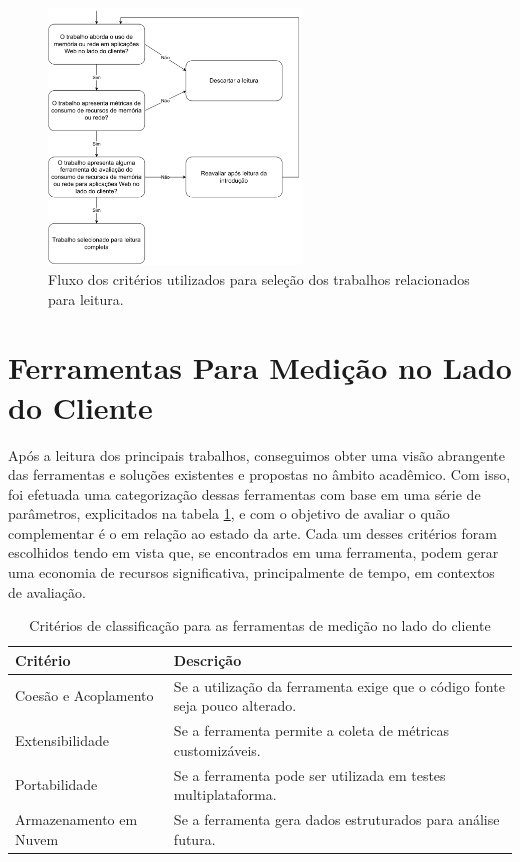 \documentclass[12pt]{tcc}
\begin{document}
	\begin{figure}[H]
		\centering
		\includegraphics[width=0.6\textwidth]{figures/fluxo-decisao-leitura.pdf}
		\caption{Fluxo dos critérios utilizados para seleção dos trabalhos relacionados para leitura.}
		\label{fig:fluxo-leitura}
	\end{figure}

	\section{Ferramentas Para Medição no Lado do Cliente}
	\label{sec:ferramentas-medicao-clientside}

	Após a leitura dos principais trabalhos, conseguimos obter uma visão abrangente das ferramentas e soluções existentes e propostas no âmbito acadêmico. Com isso, foi efetuada uma categorização dessas ferramentas com base em uma série de parâmetros, explicitados na tabela \ref{tab:criterio-avaliacao-ferramentas}, e com o objetivo de avaliar o quão complementar é o  em relação ao estado da arte. Cada um desses critérios foram escolhidos tendo em vista que, se encontrados em uma ferramenta, podem gerar uma economia de recursos significativa, principalmente de tempo, em contextos de avaliação.

	\begin{table}[H]
		\centering
		\caption{Critérios de classificação para as ferramentas de medição no lado do cliente}
		\begin{tabular}{lp{8.5cm}}
			\toprule
			\textbf{Critério} & \textbf{Descrição}\\
			\midrule 
			Coesão e Acoplamento & Se a utilização da ferramenta exige que o código fonte seja pouco alterado.\\
			Extensibilidade & Se a ferramenta permite a coleta de métricas customizáveis.\\
			Portabilidade & Se a ferramenta pode ser utilizada em testes multiplataforma.\\
			Armazenamento em Nuvem & Se a ferramenta gera dados estruturados para análise futura.\\
			\bottomrule
		\end{tabular}
		\label{tab:criterio-avaliacao-ferramentas}
	\end{table}
\end{document}
